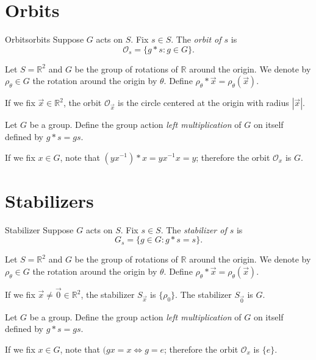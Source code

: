 \section{Orbits}

\begin{defn}{Orbits}{orbits}
  Suppose \(G\) acts on \(S\). Fix \(s \in S\). The \emph{orbit of \(s\)} is
  \[
    \mathcal{O}_s = \{g * s : g \in G\}.
  \] 
\end{defn}

\begin{exmp}{}{}
  Let \(S = \mathbb{R}^2\) and \(G\) be the group of rotations of \(\mathbb{R}\) around the origin.
  We denote by \(\rho_\theta \in G\) the rotation around the origin by \(\theta\).
  Define \(\rho_\theta * \vec x = \rho_\theta(\vec x)\).

  If we fix \(\vec x \in \mathbb{R}^2\), the orbit \(\mathcal{O}_{\vec x}\) is the circle centered at the origin with radius  \(\left|\vec x\right|\).
\end{exmp}

\begin{exmp}{}{}
	Let \(G\) be a group. Define the group action \emph{left multiplication} of \(G\) on itself defined by \(g * s = gs\).

    If we fix \(x \in G\), note that \((yx^{-1})*x=yx^{-1}x=y\); therefore the orbit \(\mathcal{O}_x\) is \(G\).
\end{exmp}

\section{Stabilizers}

\begin{defn}{Stabilizer}{}
  Suppose \(G\) acts on \(S\). Fix \(s \in S\). The \emph{stabilizer of \(s\)} is
  \[
    G_s = \{g \in G : g * s = s\}.
  \] 
\end{defn}

\begin{exmp}{}{}
  Let \(S = \mathbb{R}^2\) and \(G\) be the group of rotations of \(\mathbb{R}\) around the origin.
  We denote by \(\rho_\theta \in G\) the rotation around the origin by \(\theta\).
  Define \(\rho_\theta * \vec x = \rho_\theta(\vec x)\).

  If we fix \(\vec x \neq \vec 0 \in \mathbb{R}^2\), the stabilizer \(S_{\vec x}\) is \(\{\rho_0\}\).
  The stabilizer \(S_{\vec 0}\) is \(G\).
\end{exmp}

\begin{exmp}{}{}
	Let \(G\) be a group. Define the group action \emph{left multiplication} of \(G\) on itself defined by \(g * s = gs\).

    If we fix \(x \in G\), note that \((gx=x \iff g=e\); therefore the orbit \(\mathcal{O}_x\) is \(\{e\}\).
\end{exmp}


